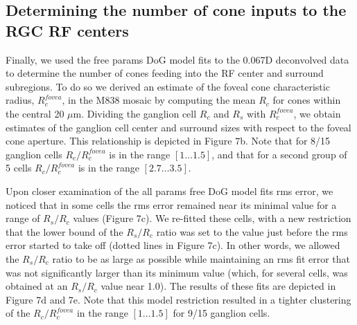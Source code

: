 \documentclass[11pt, oneside]{article}   	%
\begin{document}
\subsection{Determining the number of cone inputs to the RGC RF centers} 
Finally, we used the free params DoG model fits to the 0.067D deconvolved data to determine the number of cones feeding into the RF center and surround subregions. To do so we derived an estimate of the foveal cone characteristic radius, $R^{fovea}_c$, in the M838 mosaic by computing the mean $R_c$ for cones within the central 20 $\mu$m. Dividing the ganglion cell $R_c$ and $R_s$ with $R^{fovea}_c$, we obtain estimates of the ganglion cell center and surround sizes with respect to the foveal cone aperture. This relationship is depicted in Figure 7b. Note that for 8/15 ganglion cells $R_c/R^{fovea}_c$ is in the range $\left [ 1 \dots 1.5 \right]$, and that for a second group of 5 cells $R_c/R^{fovea}_c$ is in the range $\left [ 2.7 \dots 3.5 \right]$.

Upon closer examination of the all params free DoG model fits rms error, we noticed that in some cells the rms error remained near its minimal value for a range of $R_s/R_c$ values (Figure 7c). We re-fitted these cells, with a new restriction that the lower bound of the $R_s/R_c$ ratio was set to the value just before the rms error started to take off (dotted lines in Figure 7c). In other words, we allowed the $R_s/R_c$ ratio to be as large as possible while maintaining an rms fit error that was not significantly larger than its minimum value (which, for several cells, was obtained at an $R_s/R_c$ value near 1.0). The results of these fits are depicted in Figure 7d and 7e. Note that this model restriction resulted in a tighter clustering of the $R_c/R^{fovea}_c$ in the range $\left [ 1 \dots 1.5 \right]$ for 9/15 ganglion cells.
\end{document}
